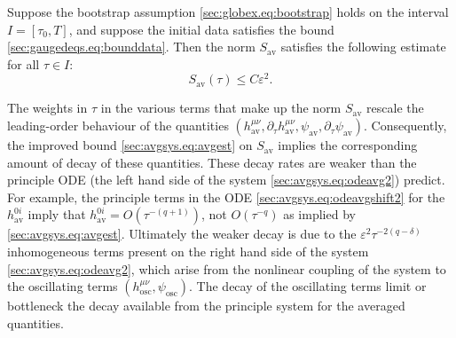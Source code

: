 \documentclass{article}
\newcommand{\osc}{\mathrm{osc}}
\newcommand{\av}{\mathrm{av}}
\newcommand{\ve}{\varepsilon}
\newcommand{\pa}{\partial}
\begin{document}
\begin{proposition}\label{sec:avgsys.prop:avgest}
    Suppose the bootstrap assumption \eqref{sec:globex.eq:bootstrap} holds on the interval $I = [\tau_0,T]$, and suppose the initial data satisfies the bound \eqref{sec:gaugedeqs.eq:bounddata}. Then the norm $S_{\av}$ satisfies the following estimate for all $\tau \in I$:
    \begin{equation}\label{sec:avgsys.eq:avgest}
        S_{\av}(\tau) \leq C\ve^2.
    \end{equation}
\end{proposition}
\begin{remark}\label{sec:avgsys.rmk:bottleneck}
    The weights in $\tau$ in the various terms that make up the norm $S_{\av}$ rescale the leading-order behaviour of the quantities $(h_{\av}^{\mu\nu},\pa_\tau h_{\av}^{\mu\nu},\psi_{\av},\pa_\tau \psi_{\av})$. Consequently, the improved bound \eqref{sec:avgsys.eq:avgest} on $S_{\av}$ implies the corresponding amount of decay of these quantities. These decay rates are weaker than the principle ODE (the left hand side of the system \eqref{sec:avgsys.eq:odeavg2}) predict. For example, the principle terms in the ODE \eqref{sec:avgsys.eq:odeavgshift2} for the $h_{\av}^{0i}$ imply that $h_{\av}^{0i} = O(\tau^{-(q+1)})$, not $O(\tau^{-q})$ as implied by \eqref{sec:avgsys.eq:avgest}. Ultimately the weaker decay is due to the $\ve^2 \tau^{-2(q-\delta)}$ inhomogeneous terms present on the right hand side of the system \eqref{sec:avgsys.eq:odeavg2}, which arise from the nonlinear coupling of the system to the oscillating terms $(h_{\osc}^{\mu\nu},\psi_{\osc})$. The decay of the oscillating terms limit or bottleneck the decay available from the principle system for the averaged quantities.
\end{remark}
\end{document}

